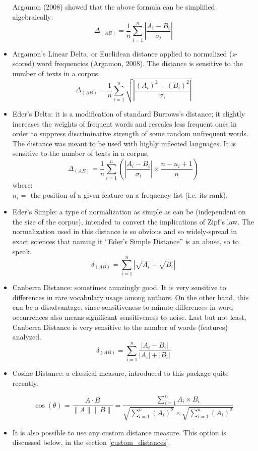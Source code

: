 \documentclass[11pt,a4paper]{article}
\def\margin#1{\marginpar{\textcolor{blue}{\footnotesize\tt #1}}}
\begin{document}
\begin{itemize}
\noindent Argamon (2008) showed that the above formula can be simplified
algebraically: 
\[
\Delta_{(AB)}=\frac{1}{n}\sum_{i=1}^{n}\left\vert \frac{A_{i}-B_{i}}{\sigma_{i}}\right\vert 
\]


\item Argamon's Linear Delta, or Euclidean distance applied to normalized
(\textit{z}-scored) word frequencies (Argamon, 2008).\margin{"dist.argamon"}
The distance is sensitive to the number of texts in a corpus. 
\[
\Delta_{(AB)}=\frac{1}{n}\sum_{i=1}^{n}\sqrt{\left\vert \frac{(A_{i})^{2}-(B_{i})^{2}}{\sigma_{i}}\right\vert }
\]

\item Eder's Delta: it is a modification of standard Burrows's distance;\margin{"dist.eder"}
it slightly increases the weights of frequent words and rescales less
frequent ones in order to suppress discriminative strength of some
random unfrequent words. The distance was meant to be used with highly
inflected languages. It is sensitive to the number of texts in a corpus.
\[
\Delta_{(AB)}=\frac{1}{n}\sum_{i=1}^{n}\left(\left\vert \frac{A_{i}-B_{i}}{\sigma_{i}}\right\vert \times\frac{n-n_{i}+1}{n}\right)
\]
where: \\
 $n_{i}=$ the position of a given feature on a frequency list (i.e. its rank).

\item Eder's Simple: a type of normalization as simple as can be (independent
on the size of the corpus), intended to convert the implications of
Zipf's law.\margin{"dist.simple"} The normalization
used in this distance is so obvious and so widely-spread in exact
sciences that naming it ``Eder's Simple Distance'' is an abuse, so to
speak. 
\[
\delta_{(AB)}=\sum_{i=1}^{n}\left\vert \sqrt{A_{i}}-\sqrt{B_{i}}\right\vert 
\]

\item Canberra Distance: sometimes amazingly good.\margin{"dist.canberra"}
It is very sensitive to differences in rare vocabulary usage among
authors. On the other hand, this can be a disadvantage, since sensitiveness
to minute differences in word occurrences also means significant sensitiveness
to noise. Last but not least, Canberra Distance is very sensitive
to the number of words (features) analyzed. 
\[
\delta_{(AB)}=\sum_{i=1}^{n}\frac{\left\vert A_{i}-B_{i}\right\vert }{\left\vert A_{i}\right\vert +\left\vert B_{i}\right\vert }
\]

\item Cosine Distance: a classical measure, introduced to this package 
quite recently.\margin{"dist.cosine"}

\[
\cos(\theta)=\frac{A\cdot B}{\|A\|\|B\|}=\frac{\sum\limits _{i=1}^{n}{A_{i}\times B_{i}}}{\sqrt{\sum\limits _{i=1}^{n}{(A_{i})^{2}}}\times\sqrt{\sum\limits _{i=1}^{n}{(A_{i})^{2}}}}
\]

\item It is also possible to use any custom distance measure. This option is 
discussed below, in the section \ref{custom_distances}.

\end{itemize}
\end{document}
